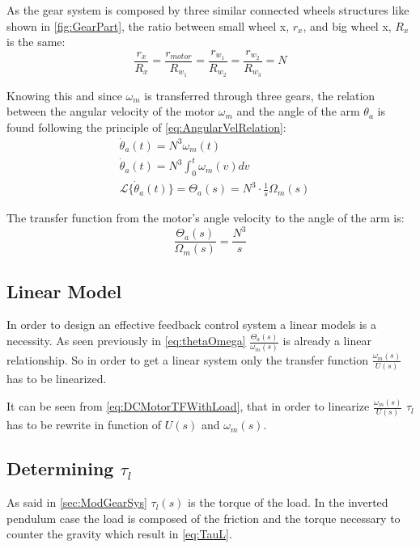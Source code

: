 As the gear system is composed by three similar connected wheels structures like shown in \autoref{fig:GearPart}, the ratio between small wheel x, $r_x$, and big wheel x, $R_x$ is the same:
\begin{equation}
	\frac{r_x}{R_x} = \frac{r_{motor}}{R_{w_1}} = \frac{r_{w_1}}{R_{w_2}} = \frac{r_{w_2}}{R_{w_3}} = N
\end{equation}

Knowing this and since $\omega_m$ is transferred through three gears, the relation between the angular velocity of the motor $\omega_m$ and the angle of the arm $\theta_a$ is found following the principle of \autoref{eq:AngularVelRelation}:
\begin{subequations} \label{eq:tech_ToA}
	\begin{flalign}
		&\dot{\theta}_a(t) = N^3 \omega_m(t) \\
		&\dot{\theta}_a(t) = N^3 \int_{0}^{t}\omega_m(v) dv \\
		&\mathscr{L}\{\dot{\theta}_a(t)\} = \Theta_a(s) = N^3 \cdot \frac{1}{s} \Omega_m(s)
	\end{flalign}
\end{subequations}

The transfer function from the motor's angle velocity to the angle of the arm is:
\begin{equation}\label{eq:thetaOmega}
	\frac{\Theta_a(s)}{\Omega_m(s)} =  \frac{N^3}{s}
\end{equation}

\subsection{Linear Model}

In order to design an effective feedback control system a linear models is a necessity. As seen previously in \autoref{eq:thetaOmega} $\frac{\Theta_a(s)}{\omega_m(s)}$ is already a linear relationship. So in order to get a linear system only the transfer function $\frac{\omega_m(s)}{U(s)}$ has to be linearized.

It can be seen from \autoref{eq:DCMotorTFWithLoad}, that in order to linearize $\frac{\omega_m(s)}{U(s)}$ $\tau_l$ has to be rewrite in function of $U(s)$ and $\omega_m(s)$.

\subsection{Determining $\tau_l$}
As said in \autoref{sec:ModGearSys} $\tau_l(s)$ is the torque of the load. In the inverted pendulum case the load is composed of the friction and the torque necessary to counter the gravity which result in \autoref{eq:TauL}.

